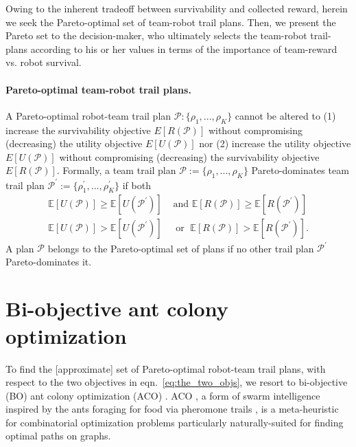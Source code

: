 \documentclass[11pt, oneside]{article}
\begin{document}
Owing to the inherent tradeoff between survivability and collected reward, herein we seek the Pareto-optimal set of team-robot trail plans. Then, we present the Pareto set to the decision-maker, who ultimately selects the team-robot trail-plans according to his or her values in terms of the importance of team-reward vs. robot survival. 

\paragraph{Pareto-optimal team-robot trail plans.} 
A Pareto-optimal robot-team trail plan $\mathcal{P}:\{\rho_1, ..., \rho_K\}$ cannot be altered to
(1) increase the survivability objective $E[R(\mathcal{P})]$ without compromising (decreasing) the utility objective $E[U(\mathcal{P})]$
nor
(2) increase the utility objective $E[U(\mathcal{P})]$ without compromising (decreasing) the survivability objective $E[R(\mathcal{P})]$.
Formally, a team trail plan $\mathcal{P}:=\{\rho_1, ..., \rho_K\}$ Pareto-dominates team trail plan  $\mathcal{P}^\prime :=\{\rho_1^\prime, ..., \rho_K^\prime\}$ if both
\begin{align}
	\mathbb{E}[U(\mathcal{P})] \geq \mathbb{E}[U(\mathcal{P}^\prime)] & \text{ and }  \mathbb{E}[R(\mathcal{P})] \geq \mathbb{E}[R(\mathcal{P}^\prime)] \\
	\mathbb{E}[U(\mathcal{P})] > \mathbb{E}[U(\mathcal{P}^\prime)] & \; \text{ or   } \; \mathbb{E}[R(\mathcal{P})] > \mathbb{E}[R(\mathcal{P}^\prime)].
\end{align}
A plan $\mathcal{P}$ belongs to the Pareto-optimal set of plans if no other trail plan $\mathcal{P}^\prime$ Pareto-dominates it.



\section{Bi-objective ant colony optimization}
To find the [approximate] set of Pareto-optimal robot-team trail plans, with respect to the two objectives in eqn.~\ref{eq:the_two_objs}, we resort to bi-objective (BO) ant colony optimization (ACO) \cite{iredi2001bi}. 
ACO \cite{dorigo2006ant}, a form of swarm intelligence \cite{bonabeau1999swarm} inspired by the ants foraging for food via pheromone trails \cite{bonabeau2000inspiration}, is a meta-heuristic for combinatorial optimization problems particularly naturally-suited for finding optimal paths on graphs. 
\end{document}
